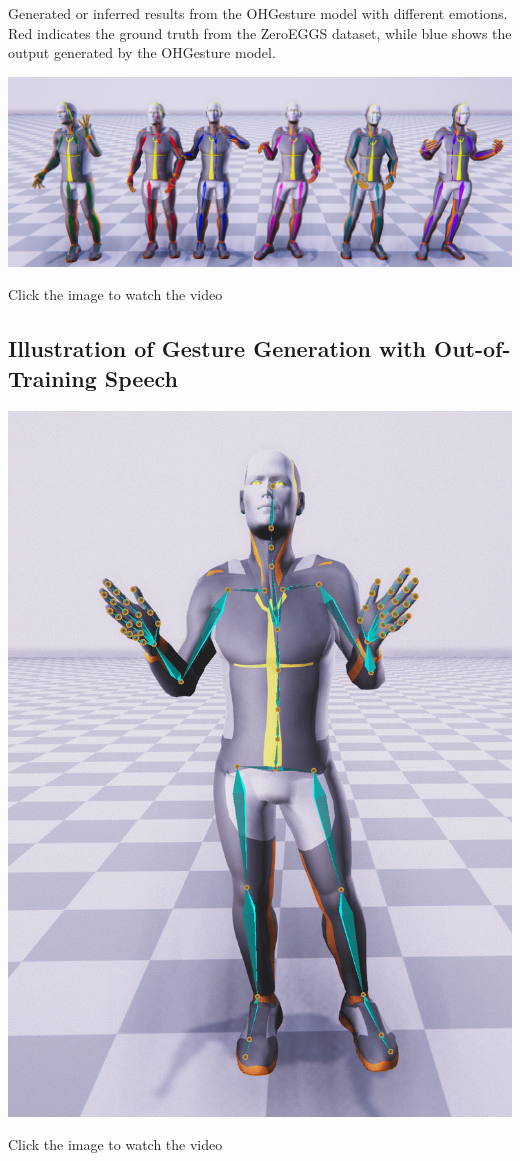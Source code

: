 Generated or inferred results from the OHGesture model with different emotions. Red indicates the ground truth from the ZeroEGGS dataset, while blue shows the output generated by the OHGesture model.

{
	\begin{center}
		\centering
		\href{https://youtu.be/eZghfNGmZn8}{%
			\includegraphics[width=\linewidth]{figures/ListOfEmotion}}
		
		{\tiny Click the image to watch the video}
	\end{center}
}

\subsection{Illustration of Gesture Generation with Out-of-Training Speech}

{
	\begin{center}
		\centering
		\href{https://www.youtube.com/watch?v=B6nv1kQmi-Q}{%
			\includegraphics[width=0.8\linewidth]{figures/StevenJob}}
		
		{\tiny Click the image to watch the video}
	\end{center}
}


